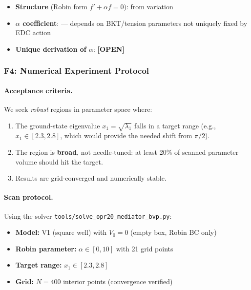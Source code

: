 \begin{tcolorbox}[colback=yellow!5!white, colframe=yellow!60!black,
    title=\textbf{Epistemic Status: Junction $\to$ Robin}]
\begin{itemize}[nosep]
    \item \textbf{Structure} (Robin form $f' + \alpha f = 0$): \tagDc{} from variation
    \item \textbf{$\alpha$ coefficient}: \tagP{} --- depends on BKT/tension parameters
          not uniquely fixed by EDC action
    \item \textbf{Unique derivation of $\alpha$}: \textbf{[OPEN]}
\end{itemize}
\end{tcolorbox}

\subsubsection{F4: Numerical Experiment Protocol}
\label{sec:attemptF_numerics}

\paragraph{Acceptance criteria.}
We seek \emph{robust} regions in parameter space where:
\begin{enumerate}[nosep]
    \item The ground-state eigenvalue $x_1 = \sqrt{\lambda_1}$ falls in a target range
          (e.g., $x_1 \in [2.3, 2.8]$, which would provide the needed shift from $\pi/2$).
    \item The region is \textbf{broad}, not needle-tuned: at least 20\% of scanned
          parameter volume should hit the target.
    \item Results are grid-converged and numerically stable.
\end{enumerate}

\paragraph{Scan protocol.}
Using the solver \texttt{tools/solve\_opr20\_mediator\_bvp.py}:
\begin{itemize}[nosep]
    \item \textbf{Model:} V1 (square well) with $V_0 = 0$ (empty box, Robin BC only)
    \item \textbf{Robin parameter:} $\alpha \in [0, 10]$ with 21 grid points
    \item \textbf{Target range:} $x_1 \in [2.3, 2.8]$
    \item \textbf{Grid:} $N = 400$ interior points (convergence verified)
\end{itemize}


